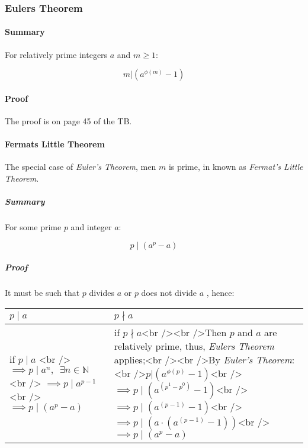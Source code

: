 \documentclass[
]{article}
\begin{document}
\hypertarget{header-n278}{%
\subsubsection{Eulers Theorem}\label{header-n278}}

\hypertarget{header-n280}{%
\paragraph{Summary}\label{header-n280}}

For relatively prime integers \(a\) and \(m \geq 1\):

\[m | (a^{\phi(m)} - 1)\]

\hypertarget{header-n283}{%
\paragraph{Proof}\label{header-n283}}

The proof is on page 45 of the TB.

\hypertarget{header-n285}{%
\paragraph{Fermats Little Theorem}\label{header-n285}}

The special case of \emph{Euler's Theorem}, men \(m\) is prime, in known
as \emph{Fermat's Little Theorem}.

\hypertarget{header-n287}{%
\subparagraph{Summary}\label{header-n287}}

For some prime \(p\) and integer \(a\):

\[p \mid (a^p -a)\]

\hypertarget{header-n290}{%
\subparagraph{Proof}\label{header-n290}}

It must be such that \(p\) divides \(a\) or \(p\) does not divide \(a\)
, hence:

\begin{longtable}[]{@{}ll@{}}
\toprule
\(p \mid a\) & \( p \nmid a\)\tabularnewline
\midrule
\endhead
if \(p \mid a\) \textless br
/\textgreater{}\(\implies p \mid a^n, \enspace \exists n \in \mathbb{N}\)\textless br
/\textgreater{} \(\implies p \mid a^{p-1}\) \textless br /\textgreater{}
\(\implies p \mid (a^p -a)\) & if \(p\nmid a\)\textless br
/\textgreater{}\textless br /\textgreater{}Then \(p\) and \(a\) are
relatively prime, thus, \emph{Eulers Theorem} applies;\textless br
/\textgreater{}\textless br /\textgreater{}By \emph{Euler's
Theorem}:\textless br /\textgreater{}\(p|(a^{\phi(p)}-1)\)\textless br
/\textgreater{}\(\implies p \mid (a^{(p^1-p^0)}-1)\)\textless br
/\textgreater{}\(\implies p \mid (a^{(p-1)}-1)\)\textless br
/\textgreater{}\(\implies p \mid (a \cdot (a^{(p-1)}-1))\)\textless br
/\textgreater{}\(\implies p \mid (a^p-a)\)\tabularnewline
\bottomrule
\end{longtable}
\end{document}
